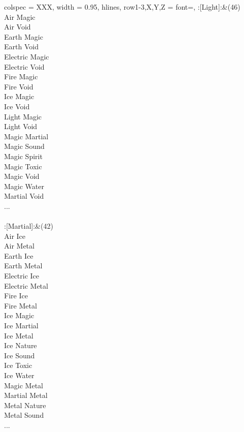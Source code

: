 \begin{longtblr}[
	caption = {1v2 Attacking Effective},
	label = {1v2-Attacking-Effective},
]{
	colspec = {XXX}, width = 0.95\linewidth,
	hlines,
	row{1-3,X,Y,Z} = {font=\bfseries},
}
	:[Light]:&{(46)\\
	Air Magic \\
	Air Void \\
	Earth Magic \\
	Earth Void \\
	Electric Magic \\
	Electric Void \\
	Fire Magic \\
	Fire Void \\
	Ice Magic \\
	Ice Void \\
	Light Magic \\
	Light Void \\
	Magic Martial \\
	Magic Sound \\
	Magic Spirit \\
	Magic Toxic \\
	Magic Void \\
	Magic Water \\
	Martial Void \\
	...\\
	}\\

	:[Martial]:&{(42)\\
	Air Ice \\
	Air Metal \\
	Earth Ice \\
	Earth Metal \\
	Electric Ice \\
	Electric Metal \\
	Fire Ice \\
	Fire Metal \\
	Ice Magic \\
	Ice Martial \\
	Ice Metal \\
	Ice Nature \\
	Ice Sound \\
	Ice Toxic \\
	Ice Water \\
	Magic Metal \\
	Martial Metal \\
	Metal Nature \\
	Metal Sound \\
	...\\
	}\\


\end{longtblr}
